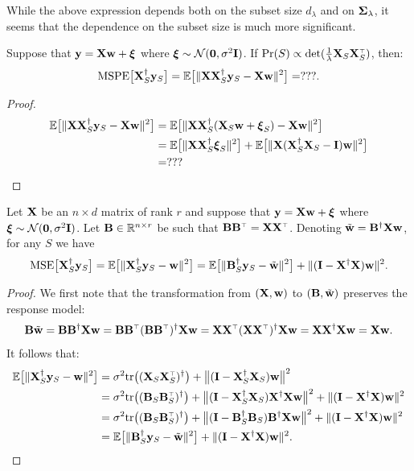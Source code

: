 \documentclass[12pt]{sty/colt2019/colt2018-arxiv}
\begin{document}
While the above expression depends both on the subset size $d_\lambda$ and
on $\mathbf{\Sigma}_\lambda$, it seems that the dependence on the subset size
is much more significant.
\begin{theorem}
Suppose that $\mathbf y = \mathbf X\mathbf w+\boldsymbol\xi$ where
$\boldsymbol\xi\sim\mathcal{N}(\mathbf 0,\sigma^2\mathbf I)$. If
$\Pr(S)\propto\det(\frac1\lambda\X_S\X_S^\top)$, then:
\begin{align*}
 {\mathrm{MSPE}\big[\mathbf X_S^\dagger\mathbf y_S\big]}= \mathbb E\big[\|\mathbf X\mathbf X_S^\dagger\mathbf y_S - \mathbf X\mathbf w\|^2\big]
  = ???.
\end{align*}
\end{theorem}
\begin{proof}
  \begin{align*}
    \mathbb E\big[\|\mathbf X\mathbf X_S^\dagger\mathbf y_S - \mathbf X\mathbf w\|^2\big]
    &= \mathbb E\big[\|\mathbf X\mathbf X_S^\dagger(\mathbf X_S\mathbf w+\boldsymbol\xi_S)-\mathbf X\mathbf w\|^2\big]\\
        & = \mathbb E\big[\|\mathbf X\mathbf X_S^\dagger\boldsymbol\xi_S\|^2\big] +
      \mathbb E\big[\|\mathbf X(\mathbf X_S^\dagger\mathbf X_S-\mathbf I)\mathbf w\|^2\big]\\
    &=???
  \end{align*}
\end{proof}
\begin{theorem}
  Let $\mathbf X$ be an $n\times d$ matrix of rank $r$ and suppose that
  $\mathbf y=\mathbf X\mathbf w+\boldsymbol\xi$ where $\boldsymbol\xi\sim\mathcal{N}(\mathbf 0,\sigma^2\mathbf I)$. Let
  $\mathbf B\in\mathbb R^{n\times r}$ be such that $\B\B^\top=\X\X^\top$. Denoting
  $\tilde{\mathbf w}=\mathbf B^\dagger\mathbf X\mathbf w$, for any $S$ we have
  \begin{align*}
{\mathrm{MSE}\big[\mathbf X_S^\dagger\mathbf y_S\big]}=\mathbb E\big[\|\mathbf X_S^\dagger\mathbf y_S-\mathbf w\|^2\big]= \mathbb E\big[\|\mathbf B_S^\dagger\mathbf y_S -
    \tilde{\mathbf w}\|^2\big] + \|(\mathbf I-\mathbf X^\dagger\mathbf X)\mathbf w\|^2.
  \end{align*}
\end{theorem}
\begin{proof}
  We first note that the transformation from $(\mathbf X,\mathbf w)$ to $(\mathbf B,\tilde{\mathbf w})$
  preserves the response model:
  \[\B\tilde\w =
    \B\B^\dagger\X\w=\B\B^\top(\B\B^\top)^\dagger\X\w=\X\X^\top(\X\X^\top)^\dagger\X\w=\X\X^\dagger\X\w=\X\w.\]
  It follows that:
  \begin{align*}
    \E\big[\|\X_S^\dagger\y_S-\w\|^2\big] &=
    \sigma^2\tr\big((\X_S\X_S^{\top})^\dagger\big) +\big\|(\I-
    \X_S^\dagger\X_S)\w\big\|^2\\
&= \sigma^2\tr\big((\B_S\B_S^\top)^\dagger\big) +
\big\|(\I-\X_S^\dagger\X_S)\X^\dagger\X\w\big\|^2
                                    + \|(\I-\X^\dagger\X)\w\|^2\\
&=\sigma^2\tr\big((\B_S\B_S^\top)^\dagger\big) +
\big\|(\I-\B_S^\dagger\B_S)\B^\dagger\X\w\big\|^2
                                    + \|(\I-\X^\dagger\X)\w\|^2\\
&=\E\big[\|\B_S^\dagger\y_S-\tilde\w\|^2\big] + \|(\I-\X^\dagger\X)\w\|^2.
  \end{align*}
\end{proof}
\end{document}
